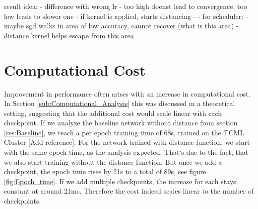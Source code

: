 result idea:
- difference with wrong lr
- too high doenst lead to convergence, too low leads to slower one
- if kernel is applied, starts distancing
- 
-
for scheduler:
- maybe sgd walks in area of low accuracy, cannot recover (what is this area)
- distance kernel helps escape from this area



\section{Computational Cost}\label{Res:Computational_cost}

Improvement in performance often arises with an increase in computational cost.
In Section \ref{sub:Computational_Analysis} this was discussed in a theoretical
setting, suggesting that the additional cost would scale linear with each
checkpoint. If we analyze the baseline network without distance from section
\ref{res:Baseline}, we reach a per epoch training time of 68s, trained on the
TCML Cluster [Add reference]. For the network trained with distance function, we
start with the same epoch time, as the analysis expected. That`s due to the
fact, that we also start training without the distance function. But once we add
a checkpoint, the epoch time rises by 21s to a total of 89s, see figure
\ref{fig:Epoch_time}. If we add multiple checkpoints, the increase for each
stays constant at around 21ms. Therefore the cost indeed scales linear to the
number of checkpoints.

